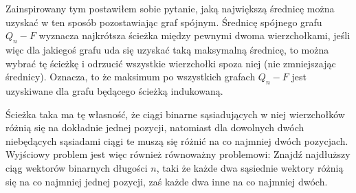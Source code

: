 \documentclass{pracamgr}
\begin{document}
   Zainspirowany tym postawiłem sobie pytanie, jaką największą średnicę można uzyskać w ten sposób pozostawiając graf spójnym.
   Średnicę spójnego grafu $Q_n-F$ wyznacza najkrótsza ścieżka między pewnymi dwoma wierzchołkami, jeśli więc dla jakiegoś grafu uda się uzyskać
   taką maksymalną średnicę, to można wybrać tę ścieżkę i odrzucić wszystkie wierzchołki spoza niej (nie zmniejszając średnicy).
   Oznacza, to że maksimum po wszystkich grafach $Q_n-F$ jest uzyskiwane dla grafu będącego ścieżką indukowaną.
   
   Ścieżka taka ma tę własność, że ciągi binarne sąsiadujących w niej wierzchołków różnią się na dokładnie jednej pozycji,
   natomiast dla dowolnych dwóch niebędących sąsiadami ciągi te muszą się różnić na co najmniej dwóch pozycjach.
   Wyjściowy problem jest więc również równoważny problemowi:\newline
   Znajdź najdłuższy ciąg wektorów binarnych długości $n$, taki
   że każde dwa sąsiednie wektory różnią się na co najmniej jednej pozycji, zaś każde dwa inne na co najmniej dwóch.
\end{document}
